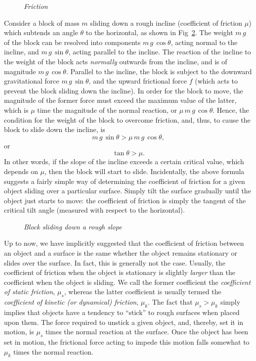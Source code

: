 \begin{figure}
\epsfysize=2in
\centerline{}
\caption{\em Friction}\label{f32}   
\end{figure}

Consider a block of mass $m$ sliding down a rough incline (coefficient of
friction $\mu$)
which subtends an angle $\theta$ to the horizontal, as shown in Fig~\ref{f33}.
The weight $m\,g$ of the block can be resolved into components $m\,g\,\cos\theta$, acting
 normal to the incline, and  $m\,g\,\sin\theta$,
acting parallel to the incline. The reaction of the incline
to the weight of the block acts {\em normally}\/ outwards from  the incline, and  is
of magnitude $m\,g\,\cos\theta$.
 Parallel to the incline, 
the block is subject
to the downward gravitational force $m\,g\,\sin\theta$,
and the upward frictional force $f$ (which acts to prevent the block sliding down the
incline). In order for the block to move, the magnitude of the former force must
exceed the maximum value of the latter, which is $\mu$ time the magnitude
of the normal reaction, or $\mu\,m\,g\,\cos\theta$. Hence, the condition
for the weight of the block to overcome friction, and, thus, to cause the block
to slide down the incline, is
\begin{equation}
m\,g\,\sin\theta > \mu\,m\,g\,\cos\theta,
\end{equation}
or 
\begin{equation}
\tan\theta > \mu.
\end{equation}
In other words, if the slope of the incline exceeds a certain critical value, which
depends on $\mu$, then the block will start to slide. Incidentally, the above formula
suggests a fairly simple way of determining the coefficient of friction for
a given object sliding over a particular surface. Simply tilt the surface gradually
until the object just starts to move: the coefficient of friction is simply the tangent of
the critical tilt angle (measured with respect to the horizontal).

\begin{figure}
\epsfysize=2in
\centerline{}
\caption{\em Block sliding down a rough slope}\label{f33}   
\end{figure}

Up to now, we have implicitly suggested that the coefficient of friction between an
object and a surface is the same whether the object remains stationary or slides over the surface.
In fact, this is generally not the case. Usually, the coefficient of friction
when the object is stationary is slightly {\em larger} than the coefficient when the object is sliding. We call the former coefficient the
{\em coefficient of static friction}, $\mu_s$, whereas the latter coefficient
is usually termed the {\em coefficient of kinetic (or dynamical) friction}, $\mu_k$. 
The fact that $\mu_s>\mu_k$ simply implies that objects have a
tendency to ``stick'' to rough surfaces when placed upon them. The force required to
unstick a given object, and, thereby, set it in motion, is $\mu_s$ times the
normal reaction at the surface. Once the object has been set in motion,
the frictional force acting to impede this motion falls somewhat to $\mu_k$ times
the normal reaction.

